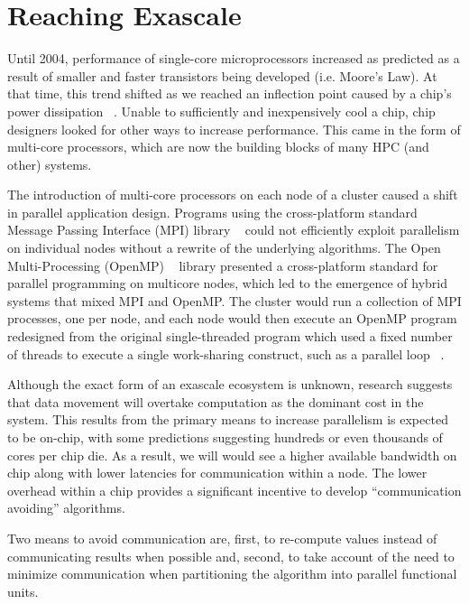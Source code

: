 \section{Reaching Exascale}
\label{sec:reaching}

Until 2004, performance of single-core microprocessors increased as
predicted as a result of smaller and faster transistors being
developed (i.e. Moore's Law). At that time, this trend shifted as we
reached an inflection point caused by a chip’s power dissipation
~\cite{kogge2013exascale}. Unable to sufficiently and inexpensively
cool a chip, chip designers looked for other ways to increase
performance. This came in the form of multi-core processors, which are
now the building blocks of many HPC (and other) systems.

The introduction of multi-core processors on each node of a cluster
caused a shift in parallel application design. Programs using the
cross-platform standard Message Passing Interface (MPI) library
~\cite{Snir:1998:MCR:552013} could not efficiently exploit parallelism
on individual nodes without a rewrite of the underlying algorithms.
The Open Multi-Processing (OpenMP) ~\cite{openmp08} library presented
a cross-platform standard for parallel programming on multicore nodes,
which led to the emergence of hybrid systems that mixed MPI and
OpenMP. The cluster would run a collection of MPI processes, one per
node, and each node would then execute an OpenMP program redesigned
from the original single-threaded program which used a fixed number of
threads to execute a single work-sharing construct, such as a parallel
loop ~\cite{gropp2013programming}.

Although the exact form of an exascale ecosystem is unknown, research
suggests that data movement will overtake computation as the dominant
cost in the system.
This results from the primary means to increase parallelism is
expected to be on-chip, with some predictions
suggesting hundreds or even thousands of cores
per chip die.
As a result, we will would see a higher available bandwidth on
chip along with lower latencies for communication within a node.
The
lower overhead within a chip provides a significant incentive to
develop ``communication avoiding'' algorithms.

Two means to avoid communication are, first, to re-compute values
instead of communicating results when possible and, second, to take
account of the need to minimize communication when partitioning the
algorithm into parallel functional units.

